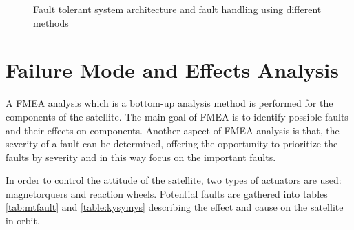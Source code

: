 \begin{figure}[H]
\begin{minipage}[b]{0.49\linewidth}
\begin{figure}[H]
		\end{figure}
	\end{minipage}
			\caption{Fault tolerant system architecture and fault handling using different methods \cite{FTJ}}
				\label{fig:1}
\end{figure}

\section{Failure Mode and Effects Analysis}
A FMEA analysis which is a bottom-up analysis method is performed for the components of the satellite. The main goal of FMEA is to identify possible faults and their effects on components. Another aspect of FMEA analysis is that, the severity of a fault can be determined, offering the opportunity to prioritize the faults by severity and in this way focus on the important faults.

In order to control the attitude of the satellite, two types of actuators are used: magnetorquers and reaction wheels. Potential faults are gathered into tables \ref{tab:mtfault} and \ref{table:kysymys} describing the effect and cause on the satellite in orbit.

